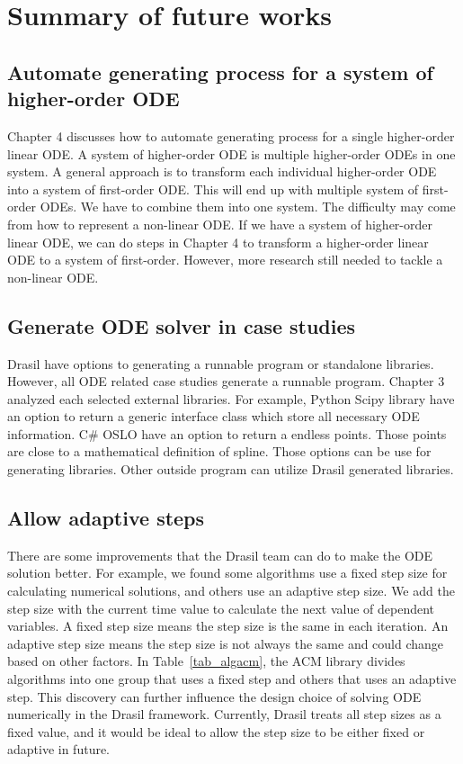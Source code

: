 \chapter{Summary of future works}

\section{Automate generating process for a system of higher-order ODE}
Chapter 4 discusses how to automate generating process for a single higher-order linear ODE. A system of higher-order ODE is multiple higher-order ODEs in one system. A general approach is to transform each individual higher-order ODE into a system of first-order ODE. This will end up with multiple system of first-order ODEs. We have to combine them into one system. The difficulty may come from how to represent a non-linear ODE. If we have a system of higher-order linear ODE, we can do steps in Chapter 4 to transform a higher-order linear ODE to a system of first-order. However, more research still needed to tackle a non-linear ODE.

\section{Generate ODE solver in case studies}
Drasil have options to generating a runnable program or standalone libraries. However, all ODE related case studies generate a runnable program. Chapter 3 analyzed each selected external libraries. For example, Python Scipy library have an option to return a generic interface class which store all necessary ODE information. C\# OSLO have an option to return a endless points. Those points are close to a mathematical definition of spline. Those options can be use for generating libraries. Other outside program can utilize Drasil generated libraries.

\section{Allow adaptive steps}
There are some improvements that the Drasil team can do to make the ODE solution better. For example, we found some algorithms use a fixed step size for calculating numerical solutions, and others use an adaptive step size. We add the step size with the current time value to calculate the next value of dependent variables. A fixed step size means the step size is the same in each iteration. An adaptive step size means the step size is not always the same and could change based on other factors. In Table~\ref{tab_algacm}, the ACM library divides algorithms into one group that uses a fixed step and others that uses an adaptive step. This discovery can further influence the design choice of solving ODE numerically in the Drasil framework. Currently, Drasil treats all step sizes as a fixed value, and it would be ideal to allow the step size to be either fixed or adaptive in future.


